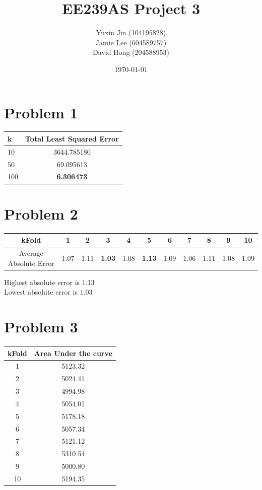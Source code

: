 \documentclass[12pt]{article}
\begin{document}
\title{\textbf{EE239AS Project 3}}
\author{Yuxin Jin \quad (104195828)\\
		Jamie Lee \quad (604589757)\\
        David Hong \quad (204588953)}
\date{\today}

\maketitle

\section*{Problem 1}
\renewcommand{\arraystretch}{1.7}%
\begin{center}
\begin{tabular}{|l | c|}
\hline
k & Total Least Squared Error \\ \hline
10 & 3644.785180 \\
50 & 69.095613 \\
100 & \textbf{6.306473} \\ \hline
\end{tabular}
\end{center}

\section*{Problem 2}
\begin{center}
\begin{tabular}{|*{11}{c|}}
\hline
kFold & 1 & 2 & 3 & 4 & 5 & 6 & 7 & 8 & 9 & 10\\ \hline
Average Absolute Error & 1.07 & 1.11 & \textbf{1.03} & 1.08 & \textbf{1.13} & 1.09 & 1.06 & 1.11 & 1.08 & 1.09 \\
\hline
\end{tabular}
\end{center}
Highest absolute error is 1.13 \\
Lowest absolute error is 1.03

\section*{Problem 3}
\begin{center}
\begin{tabular}{|*{2}{c|}}
\hline
kFold & Area Under the curve \\ \hline
1 & 5123.32 \\
2 & 5024.41 \\ 
3 & 4994.98 \\
4 & 5054.01 \\
5 & 5178.18 \\
6 & 5057.34 \\
7 & 5121.12 \\
8 & 5310.54 \\
9 & 5000.80 \\
10 & 5194.35 \\
\hline
\end{tabular}
\end{center}
\end{document}
